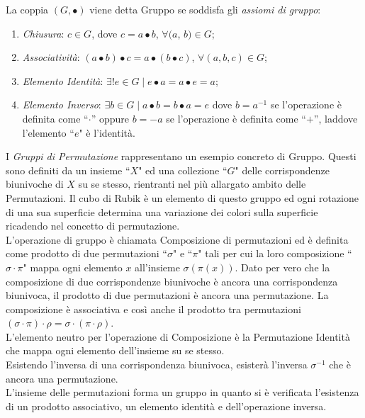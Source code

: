 \documentclass[a4paper,12pt]{tesiinfo}
\begin{document}
La coppia $ (G, \bullet)$ viene detta Gruppo se soddisfa gli \textit{assiomi di gruppo}:
\begin{enumerate}
 \item \textit{Chiusura}: $ c \in G$, dove $c = a\bullet b$, $ \forall (a$, $b) \in G$;
 \item \textit{Associativit\`a}: $\left ( a\bullet b \right ) \bullet c = a \bullet \left ( b \bullet c \right ) $, $ \forall (a, b, c) \in G$;
 \item \textit{Elemento Identit\`a}: $ \exists ! e \in G \mid e \bullet a = a \bullet e = a$;
 \item \textit{Elemento Inverso}: $\exists b \in G \mid a \bullet b = b \bullet a = e$ dove $b = a^{-1} $ se l'operazione \`e definita come ``$\cdot$'' oppure $b = -a $ se l'operazione \`e definita come ``$+$'', laddove l'elemento ``$e$" \`e l'identit\`a.
\end{enumerate} 
I \textit{Gruppi di Permutazione} rappresentano un esempio concreto di Gruppo. Questi sono definiti da un insieme ``$X$" ed una collezione ``$G$" delle corrispondenze biunivoche di $X$ su se stesso, rientranti nel pi\`u allargato ambito delle Permutazioni. Il cubo di Rubik \`e un elemento di questo gruppo ed ogni rotazione di una sua superficie determina una variazione dei colori sulla superficie ricadendo nel concetto di permutazione.
\\
L'operazione di gruppo \`e chiamata Composizione di permutazioni ed \`e definita come prodotto di due permutazioni ``$\sigma$" e ``$\pi$" tali per cui la loro composizione ``$\sigma \cdot \pi$" mappa ogni elemento $x$ all'insieme $\sigma ( \pi ( x ) )$. Dato per vero che la composizione di due corrispondenze biunivoche \`e ancora una corrispondenza biunivoca, il prodotto di due permutazioni \`e ancora una permutazione. La composizione \`e associativa e cos\`i anche il prodotto tra permutazioni $ (\sigma \cdot \pi) \cdot \rho = \sigma \cdot ( \pi \cdot \rho )$.
\\
L'elemento neutro per l'operazione di Composizione \`e la Permutazione Identit\`a che mappa ogni elemento dell'insieme su se stesso. 
\\
Esistendo l'inversa di una corrispondenza biunivoca, esister\`a l'inversa $ \sigma ^ {-1} $ che \`e ancora una permutazione.
\\
L'insieme delle permutazioni forma un gruppo in quanto si \`e verificata l'esistenza di un prodotto associativo, un elemento identit\`a e dell'operazione inversa.
%
%
%
\\\\
\end{document}
